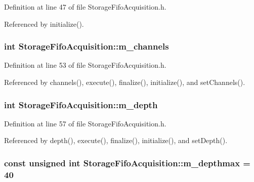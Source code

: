 Definition at line 47 of file StorageFifoAcquisition.h.

Referenced by initialize().\hypertarget{classStorageFifoAcquisition_ae3563f586533ac15f48c7f9c8fea3e7f}{
\subsubsection[{m\_\-channels}]{\setlength{\rightskip}{0pt plus 5cm}int {\bf StorageFifoAcquisition::m\_\-channels}}}
\label{classStorageFifoAcquisition_ae3563f586533ac15f48c7f9c8fea3e7f}


Definition at line 53 of file StorageFifoAcquisition.h.

Referenced by channels(), execute(), finalize(), initialize(), and setChannels().\hypertarget{classStorageFifoAcquisition_a6bebf76cce0ccaae599c844a69ebd19d}{
\subsubsection[{m\_\-depth}]{\setlength{\rightskip}{0pt plus 5cm}int {\bf StorageFifoAcquisition::m\_\-depth}}}
\label{classStorageFifoAcquisition_a6bebf76cce0ccaae599c844a69ebd19d}


Definition at line 57 of file StorageFifoAcquisition.h.

Referenced by depth(), execute(), finalize(), initialize(), and setDepth().\hypertarget{classStorageFifoAcquisition_a2f3ce0569ee9ec4fa78ec66a9cbe6ed7}{
\subsubsection[{m\_\-depthmax}]{\setlength{\rightskip}{0pt plus 5cm}const unsigned int {\bf StorageFifoAcquisition::m\_\-depthmax} = 40}}
\label{classStorageFifoAcquisition_a2f3ce0569ee9ec4fa78ec66a9cbe6ed7}


